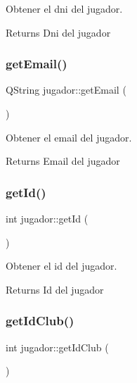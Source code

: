 Obtener el dni del jugador. 

\begin{DoxyReturn}{Returns}
Dni del jugador 
\end{DoxyReturn}
\mbox{\label{classjugador_a65a647a2c1beedbb2dc2e4b6847bff69}} 
\subsubsection{\texorpdfstring{get\+Email()}{getEmail()}}
{\footnotesize\ttfamily Q\+String jugador\+::get\+Email (\begin{DoxyParamCaption}{ }\end{DoxyParamCaption})}



Obtener el email del jugador. 

\begin{DoxyReturn}{Returns}
Email del jugador 
\end{DoxyReturn}
\mbox{\label{classjugador_ace2ea4097b89df7679c9589dc4d9dd4d}} 
\subsubsection{\texorpdfstring{get\+Id()}{getId()}}
{\footnotesize\ttfamily int jugador\+::get\+Id (\begin{DoxyParamCaption}{ }\end{DoxyParamCaption})}



Obtener el id del jugador. 

\begin{DoxyReturn}{Returns}
Id del jugador 
\end{DoxyReturn}
\mbox{\label{classjugador_a0538f173119697d49b6bfc95c9558580}} 
\subsubsection{\texorpdfstring{get\+Id\+Club()}{getIdClub()}}
{\footnotesize\ttfamily int jugador\+::get\+Id\+Club (\begin{DoxyParamCaption}{ }\end{DoxyParamCaption})}



